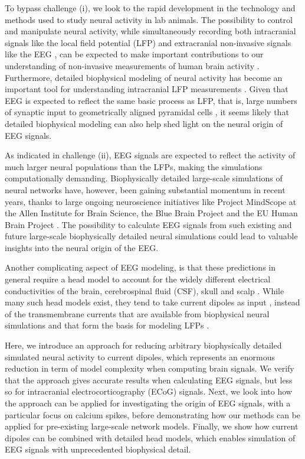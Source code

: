 \documentclass[preprint,10pt,authoryear]{elsarticle}
\begin{document}
To bypass challenge (i), we look to the rapid development in the technology and methods used to study neural activity in lab animals. The possibility to control and manipulate neural activity, while simultaneously recording both intracranial signals like the local field potential (LFP) \citep{Einevoll2007, Blomquist2009} and extracranial non-invasive signals like the EEG \citep{BRUYNS2017}, can be expected to make important contributions to our understanding of non-invasive measurements of human brain activity \citep{SILVA2013, Uhlirova2016, COHEN2017, Pesaran2018}. 
Furthermore, detailed biophysical modeling of neural activity has become an important tool for understanding intracranial LFP measurements \citep{EINEVOLL2013REVIEW, Pesaran2018}. Given that EEG is expected to reflect the same basic process as LFP, that is, large numbers of synaptic input to geometrically aligned pyramidal cells \citep{NUNEZ2006, Pesaran2018, BUZSAKI2012}, 
it seems likely that detailed biophysical modeling can also help shed light on the neural origin of EEG signals.

As indicated in challenge (ii), EEG signals are expected to reflect the activity of much larger neural populations than the LFPs, making the simulations computationally demanding. Biophysically detailed large-scale simulations of neural networks have, however, been gaining substantial momentum in recent years, thanks to large ongoing neuroscience initiatives like Project MindScope at the Allen Institute for Brain Science, the Blue Brain Project
and the EU Human Brain Project \citep{EINEVOLL2019}. The possibility to calculate EEG signals from such existing and future large-scale biophysically detailed neural simulations could lead to valuable insights into the neural origin of the EEG.

Another complicating aspect of EEG modeling, is that these predictions in general require a head model to account for the widely different electrical conductivities of the brain, cerebrospinal fluid (CSF), skull and scalp \citep{NUNEZ2006, Ilmoniemi2019}. While many such head models exist, they tend to take current dipoles as input \citep{NUNEZ2006, Pesaran2018}, instead of the transmembrane currents that are available from biophysical neural simulations and that form the basis for modeling LFPs \citep{EINEVOLL2013BOOKCHAPTER}. 

Here, we introduce an approach for reducing arbitrary biophysically detailed simulated neural activity to current dipoles, which represents an enormous reduction in term of model complexity when computing brain signals. We verify that the approach gives accurate results when calculating EEG signals, but less so for intracranial electrocorticography (ECoG) signals. Next, we look into how the approach can be applied for investigating the origin of EEG signals, with a particular focus on calcium spikes, before demonstrating how our methods can be applied for pre-existing large-scale network models. Finally, we show how current dipoles can be combined with detailed head models, which enables simulation of EEG signals with unprecedented biophysical detail.  
\end{document}
